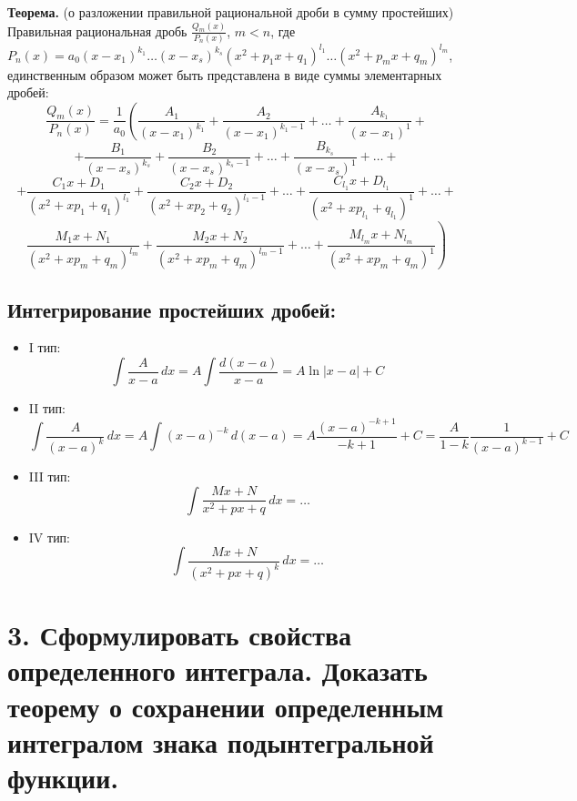\documentclass[11pt]{article}
\begin{document}
\par
\textbf{Теорема.} (о разложении правильной рациональной дроби в сумму простейших)
Правильная рациональная дробь {\Large \(\frac{Q_m(x)}{P_n(x)}\)}, \(m < n\),
где \(P_n(x) = a_{0}(x - x_{1})^{k_{1}} \dots (x - x_{s})^{k_{s}}(x^2 + p_{1}x + q_{1})^{l_{1}} \dots (x^2 + p_{m}x + q_{m})^{l_{m}}\),
единственным образом может быть представлена в виде суммы элементарных дробей:
\[\frac{Q_m(x)}{P_n(x)} = \frac{1}{a_{0}} \left( \frac{A_{1}}{(x - x_{1})^{k_{1}}} + \frac{A_{2}}{(x - x_{1})^{k_{1}-1}} + \dots + \frac{A_{k_{1}}}{(x - x_{1})^{1}} + \right.\]
\[+ \frac{B_{1}}{(x - x_{s})^{k_{s}}} + \frac{B_{2}}{(x - x_{s})^{k_{s}-1}} + \dots + \frac{B_{k_{s}}}{(x - x_{s})^{1}} + \dots  +\]
\[+ \frac{C_{1}x + D_{1}}{(x^2 + xp_{1} + q_{1})^{l_{1}}} + \frac{C_{2}x + D_{2}}{(x^2 + xp_{2} + q_{2})^{l_{1}-1}} + \dots + \frac{C_{l_{1}}x + D_{l_{1}}}{(x^2 + xp_{l_{1}} + q_{l_{1}})^{1}} + \dots + \]
\[\left. \frac{M_{1}x + N_{1}}{(x^2 + xp_{m} + q_{m})^{l_{m}}} + \frac{M_{2}x + N_{2}}{(x^2 + xp_{m} + q_{m})^{l_{m}-1}} + \dots + \frac{M_{l_{m}}x + N_{l_{m}}}{(x^2 + xp_{m} + q_{m})^{1}} \right)\]
\subsection*{Интегрирование простейших дробей:}
\begin{itemize}
\item I тип:
\[\int \frac{A}{x - a} \, dx = A \int \frac{d(x - a)}{x - a} = A \ln |x - a| + C\]
\item II тип: \[\int \frac{A}{(x - a)^k} \, dx = A \int (x - a)^{-k} \, d(x - a) = A \frac{{(x - a)^{-k+1}}}{-k + 1} + C = \frac{A}{1 - k} \frac{1}{(x-a)^{k-1}} + C\]
\item III тип: \[\int \frac{{Mx + N}}{x^2 + px + q} \, dx = \dots\]
\item IV тип: \[\int \frac{{Mx + N}}{(x^2 + px + q)^k} \, dx = \dots\]
\end{itemize}

\section*{3. Сформулировать свойства определенного интеграла. Доказать теорему о сохранении определенным интегралом знака подынтегральной функции.}
\end{document}
